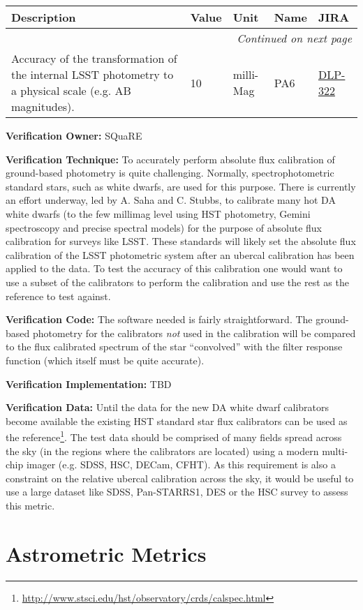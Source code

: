 \documentclass[DM,lsstdraft,toc]{lsstdoc}
\makeatletter
\newcommand{\jira}[1]{\href{https://jira.lsstcorp.org/browse/#1}{#1}}
\newenvironment{metric}[0]{%
\setlength\LTleft{0pt}
\setlength\LTright{\fill}
\begin{longtable}[]{@{}p{0.4\textwidth}lp{0.75in}p{1.3in}p{0.75in}@{}}

\hline \textbf{Description} & \textbf{Value} & \textbf{Unit} & \textbf{Name} & \textbf{JIRA} \\ \hline
\endhead

\hline \multicolumn{5}{r}{\emph{Continued on next page}} \\
\endfoot

\hline\hline
\endlastfoot
}{%
\hline
\end{longtable}
}
\makeatother
\begin{document}
\begin{metric}
Accuracy of the transformation of the internal LSST photometry to a
physical scale (e.g. AB magnitudes). & 10 & milli-Mag & PA6 &
\jira{DLP-322}\tabularnewline
\end{metric}

\textbf{Verification Owner:} SQuaRE

\textbf{Verification Technique:} To accurately perform absolute flux
calibration of ground-based photometry is quite challenging. Normally,
spectrophotometric standard stars, such as white dwarfs, are used for
this purpose. There is currently an effort underway, led by A. Saha and
C. Stubbs, to calibrate many hot DA white dwarfs (to the few millimag
level using HST photometry, Gemini spectroscopy and precise spectral
models) for the purpose of absolute flux calibration for surveys like
LSST. These standards will likely set the absolute flux calibration of
the LSST photometric system after an ubercal calibration has been
applied to the data. To test the accuracy of this calibration one would
want to use a subset of the calibrators to perform the calibration and
use the rest as the reference to test against.

\textbf{Verification Code:} The software needed is fairly
straightforward. The ground-based photometry for the calibrators
\emph{not} used in the calibration will be compared to the flux
calibrated spectrum of the star ``convolved'' with the filter response
function (which itself must be quite accurate).

\textbf{Verification Implementation:} TBD

\textbf{Verification Data:} Until the data for the new DA white dwarf
calibrators become available the existing HST standard star flux
calibrators can be used as the reference\footnote{\url{http://www.stsci.edu/hst/observatory/crds/calspec.html}}.\protect\hypertarget{_Toc301352570}{}{}
The test data should be comprised of many fields spread across the sky
(in the regions where the calibrators are located) using a modern
multi-chip imager (e.g. SDSS, HSC, DECam, CFHT). As this requirement is
also a constraint on the relative ubercal calibration across the sky, it
would be useful to use a large dataset like SDSS, Pan-STARRS1, DES or
the HSC survey to assess this metric.

\section{Astrometric Metrics}\label{astrometric-metrics}
\end{document}
